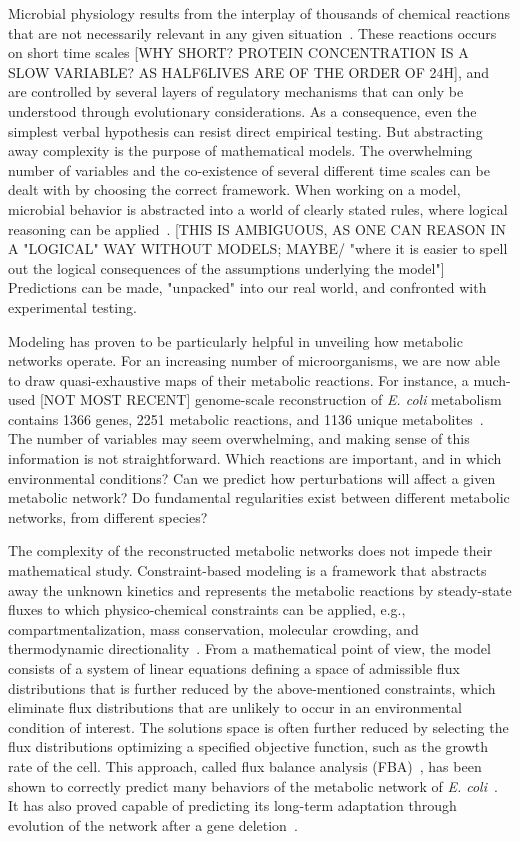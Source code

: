 Microbial physiology results from the interplay of thousands of chemical reactions that are not necessarily relevant in any given situation~\cite{schaechter_microbe_2006}.
These reactions occurs on short time scales [WHY SHORT? PROTEIN CONCENTRATION IS A SLOW VARIABLE? AS HALF6LIVES ARE OF THE ORDER OF 24H], and are controlled by several layers of regulatory mechanisms that can only be understood through evolutionary considerations.
As a consequence, even the simplest verbal hypothesis can resist direct empirical testing.
But abstracting away complexity is the purpose of mathematical models.
The overwhelming number of variables and the co-existence of several different time scales can be dealt with by choosing the correct framework.
When working on a model, microbial behavior is abstracted into a world of clearly stated rules, where logical reasoning can be applied~\cite{servedio_not_2014,mcgill_calm_2013}. [THIS IS AMBIGUOUS, AS ONE CAN REASON IN A "LOGICAL" WAY WITHOUT MODELS; MAYBE/ "where it is easier to spell out the logical consequences of the assumptions underlying the model"]
Predictions can be made, "unpacked" into our real world, and confronted with experimental testing.

Modeling has proven to be particularly helpful in unveiling how metabolic networks operate.
For an increasing number of microorganisms, we are now able to draw quasi-exhaustive maps of their metabolic reactions.
For instance, a much-used [NOT MOST RECENT] genome-scale reconstruction of \textit{E. coli} metabolism contains 1366 genes, 2251 metabolic reactions, and 1136 unique metabolites~\cite{orth_comprehensive_2011}.
The number of variables may seem overwhelming, and making sense of this information is not straightforward.
Which reactions are important, and in which environmental conditions?
Can we predict how perturbations will affect a given metabolic network?
Do fundamental regularities exist between different metabolic networks, from different species?

The complexity of the reconstructed metabolic networks does not impede their mathematical study.
Constraint-based modeling is a framework that abstracts away the unknown kinetics and represents the metabolic reactions by steady-state fluxes to which physico-chemical constraints can be applied, e.g., compartmentalization, mass conservation, molecular crowding, and thermodynamic directionality~\cite{ebrahim_cobrapy_2013}.
From a mathematical point of view, the model consists of a system of linear equations defining a space of admissible flux distributions that is further reduced by the above-mentioned constraints, which eliminate flux distributions that are unlikely to occur in an environmental condition of interest.
The solutions space is often further reduced by selecting the flux distributions optimizing a specified objective function, such as the growth rate of the cell.
This approach, called flux balance analysis (FBA)~\cite{orth_comprehensive_2011,palsson_systems_2011}, has been shown to correctly predict many behaviors of the metabolic network of \textit{E. coli}~\cite{varma_stoichiometric_1994,edwards_silico_2001}.
It has also proved capable of predicting its long-term adaptation through evolution of the network after a gene deletion~\cite{fong_metabolic_2004}.

